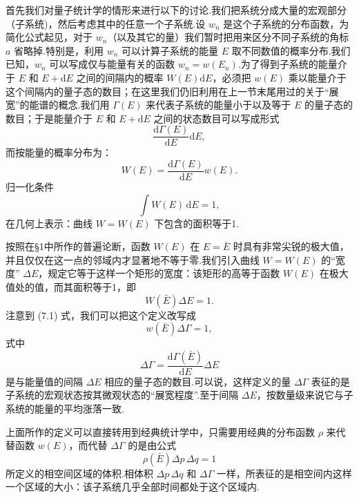 首先我们对量子统计学的情形来进行以下的讨论.我们把系统分成大量的宏观部分（子系统)，然后考虑其中的任意一个子系统.设 $w_n$ 是这个子系统的分布函数，为简化公式起见，对于 $w_n$（以及其它的量）我们暂时把用来区分不同子系统的角标 $a$ 省略掉.特别是，利用 $w_n$ 可以计算子系统的能量 $E$ 取不同数值的概率分布.我们已知，$w_n$ 可以写成仅与能量有关的函数 $w_n=w(E_n)$.为了得到子系统的能量介于 $E$ 和 $E+\mathrm{d}E$ 之间的间隔内的概率 $W(E)\mathrm{d}E$，必须把 $w(E)$ 乘以能量介于这个间隔内的量子态的数目；在这里我们仍旧利用在上一节末尾用过的关于“展宽”的能谱的概念.我们用 $\Gamma(E)$ 来代表子系统的能量小于以及等于 $E$ 的量子态的数目；于是能量介于 $E$ 和 $E+\mathrm{d}E$ 之间的状态数目可以写成形式
\begin{equation*}
  \frac{\mathrm{d}\Gamma(E)}{\mathrm{d}E}\mathrm{d}E,
\end{equation*}
而按能量的概率分布为：
\begin{equation}
  W(E)=\frac{\mathrm{d}\Gamma(E)}{\mathrm{d}E}w(E).
\end{equation}
归一化条件
\begin{equation*}
  \int W(E)\,\mathrm{d}E=1,
\end{equation*}
在几何上表示：曲线 $W=W(E)$ 下包含的面积等于1.

按照在§1中所作的普遍论断，函数 $W(E)$ 在 $E=\bar{E}$ 时具有非常尖锐的极大值，并且仅仅在这一点的邻域内才显著地不等于零.我们引入曲线 $W=W(E)$ 的“宽度” $\Delta E$，规定它等于这样一个矩形的宽度：该矩形的高等于函数 $W(E)$ 在极大值处的值，而其面积等于1，即
\begin{equation}
  W(\bar{E})\Delta E=1.
\end{equation}
注意到 (7.1) 式，我们可以把这个定义改写成
\begin{equation}
  w(\bar{E})\Delta\Gamma=1,
\end{equation}
式中
\begin{equation}
  \Delta\Gamma=\frac{\mathrm{d}\Gamma(\bar{E})}{\mathrm{d}E}\Delta E
\end{equation}
是与能量值的间隔 $\Delta E$ 相应的量子态的数目.可以说，这样定义的量 $\Delta\Gamma$ 表征的是子系统的宏观状态按其微观状态的“展宽程度”.至于间隔 $\Delta E$，按数量级来说它与子系统的能量的平均涨落一致.

上面所作的定义可以直接转用到经典统计学中，只需要用经典的分布函数 $\rho$ 来代替函数 $w(E)$，而代替 $\Delta\Gamma$ 的是由公式
\begin{equation}
  \rho(\bar{E})\Delta p\,\Delta q=1
\end{equation}
所定义的相空间区域的体积.相体积 $\Delta p\,\Delta q$ 和 $\Delta\Gamma$ 一样，所表征的是相空间内这样一个区域的大小：该子系统几乎全部时间都处于这个区域内.

